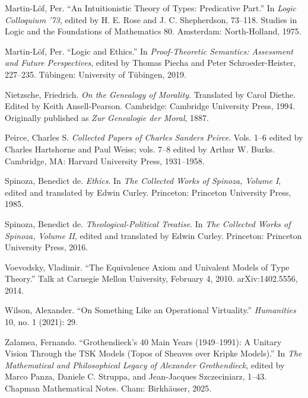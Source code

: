 \documentclass[11pt]{article}
\begin{document}
\begin{description}[leftmargin=0pt,labelwidth=0pt,itemindent=0pt,itemsep=0.55em]
\item Martin-Löf, Per. ``An Intuitionistic Theory of Types: Predicative Part.''
In \emph{Logic Colloquium '73}, edited by H. E. Rose and J. C. Shepherdson,
73--118. Studies in Logic and the Foundations of Mathematics 80. Amsterdam:
North-Holland, 1975.

\item Martin-Löf, Per. ``Logic and Ethics.'' In \emph{Proof-Theoretic Semantics:
Assessment and Future Perspectives}, edited by Thomas Piecha and Peter
Schroeder-Heister, 227--235. Tübingen: University of Tübingen, 2019.

\item Nietzsche, Friedrich. \emph{On the Genealogy of Morality}. Translated by
Carol Diethe. Edited by Keith Ansell-Pearson. Cambridge: Cambridge University
Press, 1994. Originally published as \emph{Zur Genealogie der Moral}, 1887.

\item Peirce, Charles S. \emph{Collected Papers of Charles Sanders Peirce}. Vols.
1--6 edited by Charles Hartshorne and Paul Weiss; vols. 7--8 edited by Arthur W.
Burks. Cambridge, MA: Harvard University Press, 1931--1958.

\item Spinoza, Benedict de. \emph{Ethics}. In \emph{The Collected Works of
Spinoza, Volume I}, edited and translated by Edwin Curley. Princeton: Princeton
University Press, 1985.

\item Spinoza, Benedict de. \emph{Theological-Political Treatise}. In \emph{The
Collected Works of Spinoza, Volume II}, edited and translated by Edwin Curley.
Princeton: Princeton University Press, 2016.

\item Voevodsky, Vladimir. ``The Equivalence Axiom and Univalent Models of Type
Theory.'' Talk at Carnegie Mellon University, February 4, 2010. arXiv:1402.5556,
2014.

\item Wilson, Alexander. ``On Something Like an Operational Virtuality.''
\emph{Humanities} 10, no. 1 (2021): 29.

\item Zalamea, Fernando. ``Grothendieck’s 40 Main Years (1949--1991): A Unitary
Vision Through the TSK Models (Topos of Sheaves over Kripke Models).'' In
\emph{The Mathematical and Philosophical Legacy of Alexander Grothendieck},
edited by Marco Panza, Daniele C. Struppa, and Jean-Jacques Szczeciniarz, 1--43.
Chapman Mathematical Notes. Cham: Birkhäuser, 2025.
\end{description}
\end{document}

